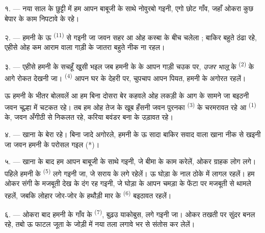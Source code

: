 
\VUsaut{4.0mm}
\VUsaut{3.0mm}
\VUfilet{16mm}
\VUsaut{5.6mm}
\VUsaut{3.0mm}

\VUsaut{3.0mm}

\VUsaut{4.0mm}

१. --- नया साल के छुट्टी में हम आपन बाबूजी के साथे नोवुरबो गइनी, एगो
छोट गाँव, जहाँ ओकरा कुछ बेपार के काम निपटावे के रहे।

२. --- हमनी के ऊ  \textsuperscript{(11)} से गइनी जा जवन
सहर आ ओह कस्बा के बीच चलेला ; बाकिर बहुते ठंढा रहे, एहीसे ओह कम आराम
वाला गाड़ी के जातरा बहुते नीक ना रहल।

३. --- एहीसे हमनी के सचहूँ खुसी भइल जब हमनी के  के
आपन गाड़ी चउक पर, \textit{उजर भालू} के  \textsuperscript{(2)}
के आगे रोकत देखनी जा।  \textsuperscript{(4)} आपन घर के
देहरी पर, चुपचाप आपन  पियत, हमनी के अगोरत रहलें।

ऊ हमनी के भीतर बोलवलें आ हम बिना दोसरा बेर कहवले ओह लकड़ी के आग के
सामने जा बइठनी जवन चूल्हा में चटकत रहे। तब हम ओह तेज  के खूब हँसनी जवन पुरनका  \textsuperscript{(3)} के
चरमरावत रहे आ  \textsuperscript{(1)} के, जवन अँगीठी से निकलत
रहे, करिया बवंडर बना के उड़ावत रहे।

४. --- खाना के बेरा रहे। बिना जादे अगोरले, हमनी के ऊ सादा बाकिर
सवाद वाला खाना नीक से खइनी जा जवन हमनी के परोसल गइल (*)।

\VUsaut{3.0mm}

५. --- खाना के बाद हम आपन बाबूजी के साथे गइनी, जे बीमा के काम करेलें,
ओकर ग्राहक लोग लगे। पहिले हमनी के  \textsuperscript{(5)} लगे
गइनी जा, जे सराय के लगे रहेलें। ऊ घोड़ा के नाल ठोके में लागल रहलें। हम
ओकर संगी के मजबूती देख के दंग रह गइनी, जे घोड़ा के  आपन
चमड़ा के फेंटा पर मजबूती से थामले रहलें, जबकि लोहार जोर-जोर के हथौड़ी
मार के  \textsuperscript{(6)} बइठावत रहलें।

६. --- ओकरा बाद हमनी के गाँव के  \textsuperscript{(7)},
बुढ़उ याकोबुस, लगे गइनी जा। ओकर तखती पर सुंदर  बनल रहे,
तबो ऊ फाटल जूता के जोड़ी में नया तला लगावे भर से संतोस कर लेलें।

